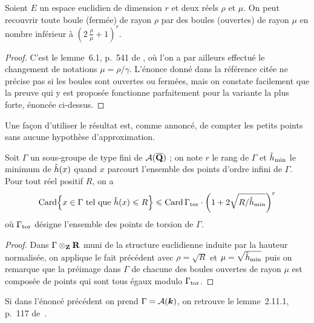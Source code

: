 \begin{fact}
  Soient \( E \) un espace euclidien de dimension \( r \) et deux réels \(
    \rho \) et \( \mu \). On peut recouvrir toute boule (fermée) de rayon \(
    \rho \) par des boules (ouvertes) de rayon \( \mu \) en nombre inférieur à
  \( ( 2 \, \frac\rho\mu + 1 )^r \).
\end{fact}

\begin{proof}
  C'est le lemme~6.1, p.~541 de \cite{remdcl}, où l'on a par ailleurs effectué
  le changement de notations \( \mu = \rho / \gamma \).  L'énonce donné dans
  la référence citée ne précise pas si les boules sont ouvertes ou fermées,
  mais on constate facilement que la preuve qui y est proposée fonctionne
  parfaitement pour la variante la plus forte, énoncée ci-dessus.
\end{proof}

Une façon d'utiliser le résultat est, comme annoncé, de compter les petits
points sans aucune hypothèse d'approximation.

\begin{coro}
  Soit \( \Gamma \) un sous-groupe de type fini de \( \mathcal A(\overline{{\mathbf{Q}}}) \) ; on note
  \( r \) le rang de \( \Gamma \) et \( \hat h_{\mathrm{min}} \) le minimum de \( \hat h (x) \)
  quand \( x \) parcourt l'ensemble des points d'ordre infini de \( \Gamma \).
  Pour tout réel positif \( R \), on a
  \begin{equation}
    \card \set*{
      x \in \Gamma
      \text{ tel que }
      \hautn x \le R
    }
    \le
    \card \Gamma_\torsion
    \cdot
    \left( 1 + 2\sqrt{R / \hmin} \right)^r
  \end{equation}
  où \( \Gamma_{\mathrm{tor}} \) désigne l'ensemble des points de torsion de \(
    \Gamma \).
\end{coro}

\begin{proof}
  Dans \( \Gamma \otimes_{\mathbf{Z}} {\mathbf{R}} \) muni de la structure euclidienne induite par
  la hauteur normalisée, on applique le fait précédent avec \( \rho = \sqrt R
  \) et \( \mu = \sqrt{\hat h_{\mathrm{min}}} \) puis on remarque que la préimage dans \(
    \Gamma \) de chacune des boules ouvertes de rayon \( \mu \) est composée
  de points qui sont tous égaux modulo \( \Gamma_{\mathrm{tor}} \).
\end{proof}

\begin{rem}
  Si dans l'énoncé précédent on prend \( \Gamma = \mathcal A({\boldsymbol k}) \), on retrouve le
  lemme~2.11.1, p.~117 de~\cite{farhith}.
\end{rem}

